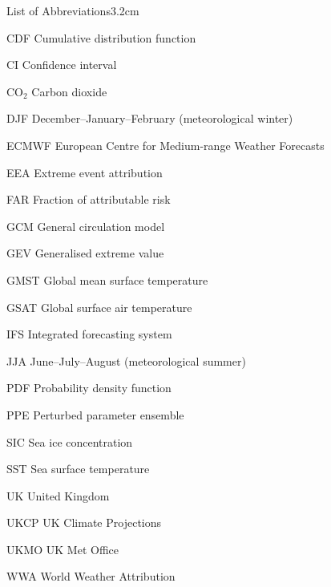 \begin{mclistof}{List of Abbreviations}{3.2cm}

    \item[CDF] Cumulative distribution function
    \item[CI] Confidence interval 
    \item[CO$_2$] Carbon dioxide
    \item[DJF] December--January--February (meteorological winter)
    \item[ECMWF] European Centre for Medium-range Weather Forecasts
    \item[EEA] Extreme event attribution
    \item[FAR] Fraction of attributable risk
    \item[GCM] General circulation model
    \item[GEV] Generalised extreme value
    \item[GMST] Global mean surface temperature
    \item[GSAT] Global surface air temperature
    \item[IFS] Integrated forecasting system
    \item[JJA] June--July--August (meteorological summer)
    \item[PDF] Probability density function
    \item[PPE] Perturbed parameter ensemble
    \item[SIC] Sea ice concentration
    \item[SST] Sea surface temperature
    \item[UK] United Kingdom
    \item[UKCP] UK Climate Projections
    \item[UKMO] UK Met Office
    \item[WWA] World Weather Attribution

\end{mclistof}